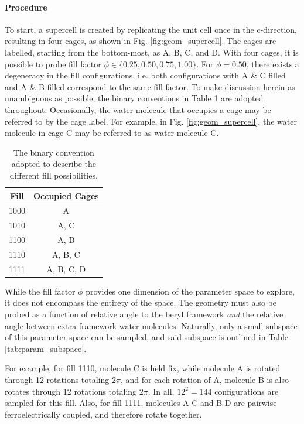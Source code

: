     \paragraph{Procedure} To start, a supercell is created by replicating the unit cell once in the c-direction, resulting in four cages, as shown in Fig. \ref{fig:geom_supercell}. The cages are labelled, starting from the bottom-most, as A, B, C, and D. With four cages, it is possible to probe fill factor $\phi \in \{0.25,0.50,0.75,1.00 \}$. For $\phi=0.50$, there exists a degeneracy in the fill configurations, i.e. both configurations with A \& C filled and A \& B filled correspond to the same fill factor. To make discussion herein as unambiguous as possible, the binary conventions in Table \ref{tab:fill_conventions} are adopted throughout. Occasionally, the water molecule that occupies a cage may be referred to by the cage label. For example, in Fig. \ref{fig:geom_supercell}, the water molecule in cage C may be referred to as water molecule C. 
    
    \begin{table}[]
        \centering
        \begin{tabular}{c|c}
           Fill  & Occupied Cages \\
           \hline
           \hline
           1000  &  A \\
           1010  &  A, C \\
           1100  &  A, B \\
           1110  &  A, B, C \\
           1111  &  A, B, C, D\\
        \end{tabular}
        \caption{The binary convention adopted to describe the different fill possibilities.}
        \label{tab:fill_conventions}
    \end{table}
    
    While the fill factor $\phi$ provides one dimension of the parameter space to explore, it does not encompass the entirety of the space. The geometry must also be probed as a function of relative angle to the beryl framework \textit{and} the relative angle between extra-framework water molecules. Naturally, only a small subspace of this parameter space can be sampled, and said subspace is outlined in Table \ref{tab:param_subspace}.
    
    For example, for fill 1110, molecule C is held fix, while molecule A is rotated through 12 rotations totaling $2\pi$, and for each rotation of A, molecule B is also rotates through 12 rotations totaling $2\pi$. In all, $12^2 = 144$ configurations are sampled for this fill. Also, for fill 1111, molecules A-C and B-D are pairwise ferroelectrically coupled, and therefore rotate together. 
    
